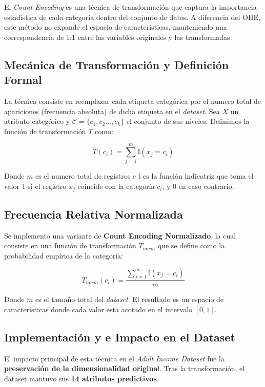 \documentclass[a4paper,10pt]{book}
\begin{document}
		El \textit{Count Encoding} es una técnica de transformación que captura la importancia estadística de cada categoría dentro del conjunto de datos. A diferencia del OHE, este método no expande el espacio de características, manteniendo una correspondencia de 1:1 entre las variables originales y las transformadas.
		
		\subsection{Mecánica de Transformación y Definición Formal}
			
			La técnica consiste en reemplazar cada etiqueta categórica por el numero total de apariciones (frecuencia absoluta) de dicha etiqueta en el \textit{dataset}.
			Sea $X$ un atributo categórico y $\mathcal{C} = \{c_1, c_2 \dots, c_k\}$ el conjunto de sus niveles. Definimos la función de transformación $T$ como: 
			
			\begin{equation}
				T(c_i) = \sum_{j=1}^{m} \mathbb{I}(x_j = c_i)
			\end{equation}
			
			Donde $m$ es el numero total de registros e $\mathbb{I}$ es la función indicatriz que toma el valor 1 si el registro $x_j$ coincide con la categoría $c_i$, y 0 en caso contrario.
		
		\subsection{Frecuencia Relativa Normalizada}
			
			Se implemento una variante de \textbf{Count Encoding Normalizado}, la cual consiste en una función de transformación $T_{norm}$ que se define como la probabilidad empírica de la categoría:
			
			\begin{equation}
				T_{norm}(c_i) = \frac{\sum_{j=1}^{m} \mathbb{I}(x_j = c_i)}{m}
			\end{equation}
			
			Donde $m$ es el tamaño total del \textit{dataset}. El resultado es un espacio de características donde cada valor esta acotado en el intervalo $[0, 1]$.
		
		\subsection{Implementación y e Impacto en el Dataset}
			
			El impacto principal de esta técnica en el \textit{Adult Income Dataset} fue la \textbf{preservación de la dimensionalidad origina}l. Tras la transformación, el dataset mantuvo sus \textbf{14 atributos predictivos}.
\end{document}
